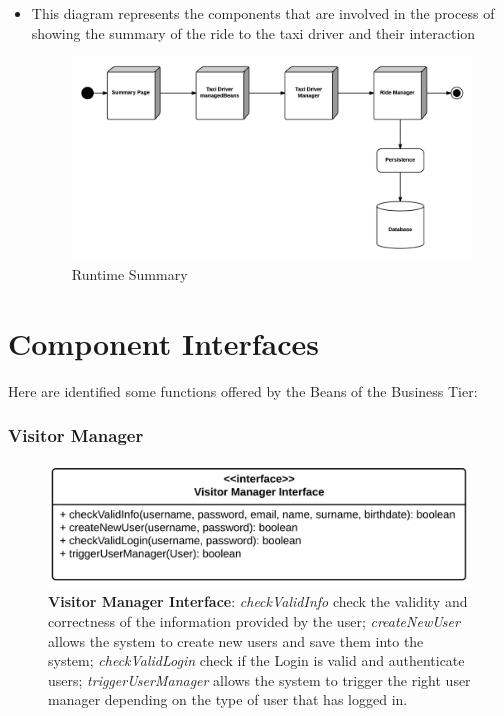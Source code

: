 \begin{itemize}
	\item This diagram represents the components that are involved in the process of showing the summary of the ride to the taxi driver and their interaction
	\begin{figure}[htbp]
	\centering
	\includegraphics[width=\textwidth]{cpt/img/RuntimeSummaryView}
	\caption{Runtime Summary}
	\end{figure}
	\clearpage

\end{itemize}

\section{Component Interfaces}
Here are identified some functions offered by the Beans of the Business Tier:

\subsubsection{Visitor Manager}
\begin{figure}[htbp]
\centering
\includegraphics[width=\textwidth]{cpt/img/ComponentInterfacesVisitorManager}
\caption{\textbf{Visitor Manager Interface}: \textit{checkValidInfo} check the validity and correctness of the information provided by the user; \textit{createNewUser} allows the system to create new users and save them into the system; \textit{checkValidLogin} check if the Login is valid and authenticate users; \textit{triggerUserManager} allows the system to trigger the right user manager depending on the type of user that has logged in.
}
\end{figure}
\clearpage

